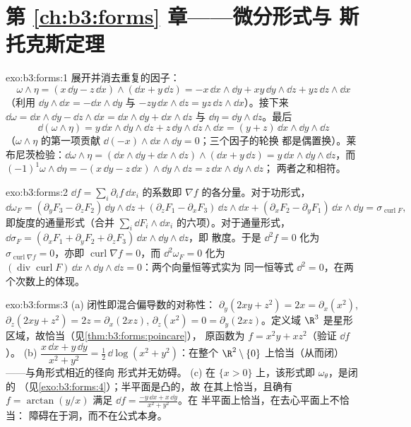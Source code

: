 \section*{第 \ref{ch:b3:forms} 章——微分形式与
斯托克斯定理}

\begin{solution}{exo:b3:forms:1}
展开并消去重复的因子：
\[
\omega\wedge\eta = (x\,\dd y - z\,\dd x)\wedge(\dd x +
y\,\dd z)
= -x\,\dd x\wedge\dd y + xy\,\dd y\wedge\dd z +
yz\,\dd z\wedge\dd x
\]
（利用 $\dd y\wedge\dd x = -\dd x\wedge\dd y$ 与 $-zy\,\dd
x\wedge\dd z = yz\,\dd z\wedge\dd x$）。接下来 $\dd\omega =
\dd x\wedge\dd y - \dd z\wedge\dd x = \dd x\wedge\dd y +
\dd x\wedge\dd z$ 与 $\dd\eta = \dd y\wedge\dd z$。最后
\[
\dd(\omega\wedge\eta) = y\,\dd x\wedge\dd y\wedge\dd z +
z\,\dd y\wedge\dd z\wedge\dd x = (y + z)\,\dd x\wedge\dd
y\wedge\dd z
\]
（$\omega\wedge\eta$ 的第一项贡献 $\dd(-x)
\wedge\dd x\wedge\dd y = 0$；三个因子的轮换
都是偶置换）。莱布尼茨检验：$\dd\omega\wedge\eta =
(\dd x\wedge\dd y + \dd x\wedge\dd z)\wedge(\dd x + y\,\dd
z) = y\,\dd x\wedge\dd y\wedge\dd z$，而
$(-1)^1\omega\wedge\dd\eta = -(x\,\dd y - z\,\dd
x)\wedge\dd y\wedge\dd z = z\,\dd x\wedge\dd y\wedge\dd z$；
两者之和相符。
\end{solution}

\begin{solution}{exo:b3:forms:2}
$\dd f = \sum_i\partial_if\,\dd x_i$ 的系数即
$\nabla f$ 的各分量。对于功形式，
\[
\dd\omega_F = (\partial_yF_3 - \partial_zF_2)\,\dd y\wedge\dd
z + (\partial_zF_1 - \partial_xF_3)\,\dd z\wedge\dd x +
(\partial_xF_2 - \partial_yF_1)\,\dd x\wedge\dd y =
\sigma_{\operatorname{curl}F},
\]
即旋度的通量形式（合并
$\sum_i\dd F_i\wedge\dd x_i$ 的六项）。对于通量形式，
$\dd\sigma_F = (\partial_xF_1 + \partial_yF_2 +
\partial_zF_3)\,\dd x\wedge\dd y\wedge\dd z$，即
散度。于是 $\dd^2f = 0$ 化为
$\sigma_{\operatorname{curl}\nabla f} = 0$，亦即
$\operatorname{curl}\nabla f = 0$，而 $\dd^2\omega_F = 0$
化为 $(\operatorname{div}\operatorname{curl}F)\,\dd
x\wedge\dd y\wedge\dd z = 0$：两个向量恒等式实为
同一恒等式 $\dd^2 = 0$，在两个次数上的体现。
\end{solution}

\begin{solution}{exo:b3:forms:3}
(a) 闭性即混合偏导数的对称性：
$\partial_y(2xy + z^2) = 2x = \partial_x(x^2)$,
$\partial_z(2xy + z^2) = 2z = \partial_x(2xz)$,
$\partial_z(x^2) = 0 = \partial_y(2xz)$。定义域 $\R^3$
是星形区域，故恰当（见\cref{thm:b3:forms:poincare}），
原函数为 $f = x^2y + xz^2$（验证 $\dd f$）。
(b) $\dfrac{x\,\dd x + y\,\dd y}{x^2 + y^2} =
\tfrac12\,\dd\log(x^2 + y^2)$：在整个
$\R^2\setminus\{0\}$ 上恰当（从而闭）——与角形式相近的径向
形式并无妨碍。
(c) 在 $\{x > 0\}$ 上，该形式即 $\omega_\theta$，是闭的
（见\cref{exo:b3:forms:4}）；半平面是凸的，故
在其上恰当，且确有 $f = \arctan(y/x)$ 满足 $\dd f
= \frac{-y\,\dd x + x\,\dd y}{x^2 + y^2}$。在
半平面上恰当，在去心平面上不恰当：
障碍在于洞，而不在公式本身。
\end{solution}

